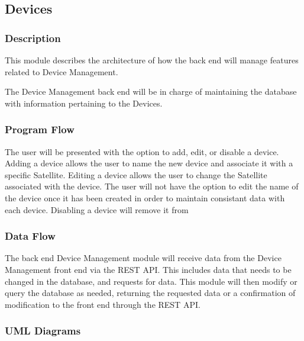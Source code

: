 
\subsection{Devices}

\subsubsection{Description}

This module describes the architecture of how the back end will manage features related to Device Management.

The Device Management back end will be in charge of maintaining the database with information pertaining to the Devices. 

 

\subsubsection{Program Flow}

The user will be presented with the option to add, edit, or disable a device. 
Adding a device allows the user to name the new device and associate it with a specific Satellite. 
Editing a device allows the user to change the Satellite associated with the device. 
The user will not have the option to edit the name of the device once it has been created in order to maintain consistant data with each device. 
Disabling a device will remove it from 


\subsubsection{Data Flow}

The back end Device Management module will receive data from the Device Management front end via the REST API. 
This includes data that needs to be changed in the database, and requests for data. 
This module will then modify or query the database as needed, 
returning the requested data or a confirmation of modification to the front end through the REST API. 



\subsubsection{UML Diagrams}

